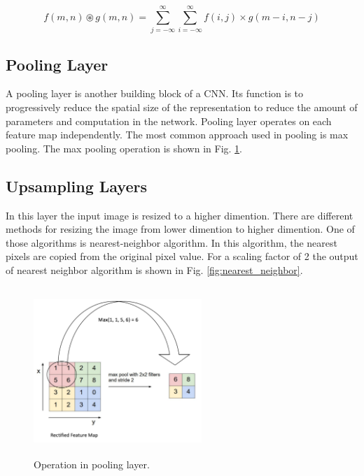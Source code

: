 \documentclass[conference]{IEEEtran}
\begin{document}
\begin{equation}
f(m,n)\circledast g(m,n)=\sum_{j=-\infty}^{\infty}\sum_{i=-\infty}^{\infty}f(i,j)\times g(m-i,n-j)
\label{eqn:conv}
\end{equation}

\subsection{Pooling Layer}
A pooling layer is another building block of a CNN. Its function is to progressively reduce the spatial size of the representation to reduce the amount of parameters and computation in the network. Pooling layer operates on each feature map independently. The most common approach used in pooling is max pooling. The max pooling operation is shown in Fig. \ref{fig:pooling_layer}.

\subsection{Upsampling Layers}
In this layer the input image is resized to a higher dimention. There are different methods for resizing the image from lower dimention to higher dimention. One of those algorithms is nearest-neighbor algorithm. In this algorithm, the nearest pixels are copied from the original pixel value. For a scaling factor of 2 the output of nearest neighbor algorithm   is shown in Fig. \ref{fig:nearest_neighbor}.

\begin{figure}[!t]
	\centerline{\includegraphics[width=2.5in, height=2.5in]{poolinglayer}}
	\caption{Operation in pooling layer. \cite{anintuitivecnn}}
	\label{fig:pooling_layer}
\end{figure}
\end{document}

